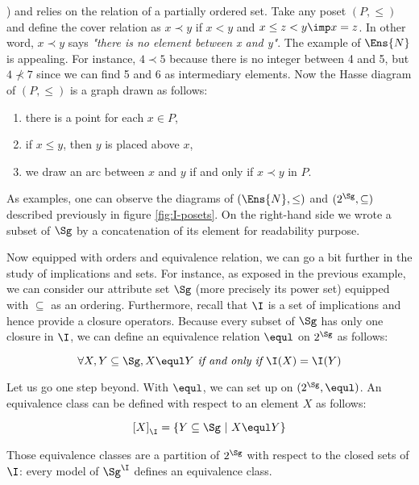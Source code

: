 \cite{davey_introduction_2002}) and relies on the  relation of
a partially ordered set. Take any poset $(P, \leq)$ and define the cover 
relation as $x \prec y$ if $x < y$ and $x \leq z < y \imp x = z$. In other 
word, $x \prec y$ says \textit{"there is no element between x and y"}. The
example of $\Ens{N}$ is appealing. For instance, $4 \prec 5$ because there is
no integer between 4 and 5, but $4 \nprec 7$ since we can find 5 and 6 as 
intermediary elements. Now the Hasse diagram of $(P, \leq)$ is a graph drawn as 
follows:
\begin{enumerate}
	\item there is a point for each $x \in P$,
	\item if $x \leq y$, then $y$ is placed above $x$,
	\item we draw an arc between $x$ and $y$ if and only if $x \prec y$ in $P$.
\end{enumerate}
As examples, one can observe the diagrams of $(\Ens{N}, \leq)$ and $(2^{\Sg}, 
\subseteq)$ described previously in figure \ref{fig:I-posets}. On the right-hand
side we wrote a subset of $\Sg$ by a concatenation of its element for 
readability purpose.


\begin{figure}[ht]
	
\end{figure}

\vspace{1.2em}

Now equipped with orders and equivalence relation, we can go a bit further in
the study of implications and sets. For instance, as exposed in the previous 
example, we can consider our attribute set $\Sg$ (more precisely its power set)
equipped with $\subseteq$ as an ordering. Furthermore, recall that $\I$ is
a set of implications and hence provide a closure operators. Because every 
subset of $\Sg$ has only one closure in $\I$, we can define an equivalence 
relation $\equl$ on $2^{\Sg}$ as follows:

	\[ \forall X, Y \subseteq \Sg, X \equl Y \textit{ if and only if }
	\I(X) = \I(Y) \]

\noindent Let us go one step beyond. With $\equl$, we can set up 
 on $(2^{\Sg}, \equl)$. An equivalence class can be 
defined with respect to an element $X$ as follows:

	\[ \left[ X \right]_{\I} = \{ Y \subseteq \Sg \ | \ X \equl Y \}  \]
	
\noindent Those equivalence classes are a partition of $2^{\Sg}$ with respect
to the closed sets of $\I$: every model of $\Sg^{\I}$ defines an 
equivalence class. 

